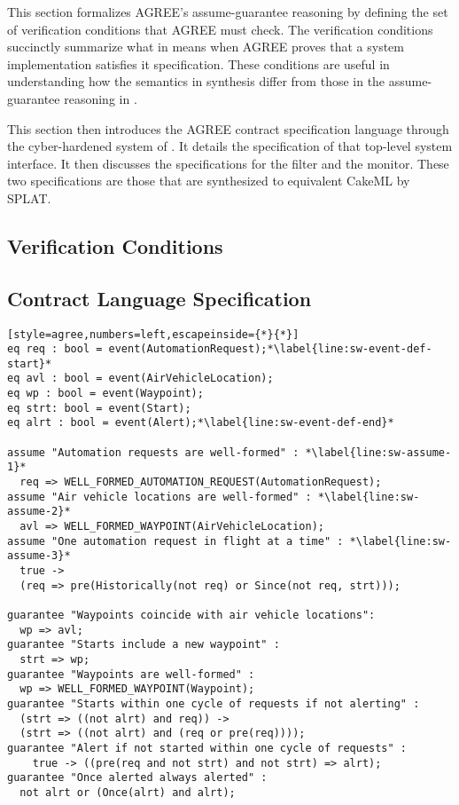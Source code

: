 This section formalizes AGREE's assume-guarantee reasoning by defining the set of verification conditions that AGREE must check.
The verification conditions succinctly summarize what in means when AGREE proves that a system implementation satisfies it specification.
These conditions are useful in understanding how the semantics in synthesis differ from those in the assume-guarantee reasoning in .

This section then introduces the AGREE contract specification language through the cyber-hardened system of .
It details the specification of that top-level system interface.
It then discusses the specifications for the filter and the monitor.
These two specifications are those that are synthesized to equivalent CakeML by SPLAT.

\subsection{Verification Conditions}


\subsection{Contract Language Specification}
\newsavebox{\sw}
\begin{lrbox}{\sw}
\begin{lstlisting}[style=agree,numbers=left,escapeinside={*}{*}]
eq req : bool = event(AutomationRequest);*\label{line:sw-event-def-start}*
eq avl : bool = event(AirVehicleLocation);
eq wp : bool = event(Waypoint);
eq strt: bool = event(Start);
eq alrt : bool = event(Alert);*\label{line:sw-event-def-end}*

assume "Automation requests are well-formed" : *\label{line:sw-assume-1}*
  req => WELL_FORMED_AUTOMATION_REQUEST(AutomationRequest);
assume "Air vehicle locations are well-formed" : *\label{line:sw-assume-2}*
  avl => WELL_FORMED_WAYPOINT(AirVehicleLocation);    
assume "One automation request in flight at a time" : *\label{line:sw-assume-3}*
  true -> 
  (req => pre(Historically(not req) or Since(not req, strt)));
      
guarantee "Waypoints coincide with air vehicle locations":
  wp => avl;
guarantee "Starts include a new waypoint" :
  strt => wp;
guarantee "Waypoints are well-formed" : 
  wp => WELL_FORMED_WAYPOINT(Waypoint);
guarantee "Starts within one cycle of requests if not alerting" :
  (strt => ((not alrt) and req)) -> 
  (strt => ((not alrt) and (req or pre(req))));
guarantee "Alert if not started within one cycle of requests" :
    true -> ((pre(req and not strt) and not strt) => alrt);
guarantee "Once alerted always alerted" :
  not alrt or (Once(alrt) and alrt);
\end{lstlisting}
\end{lrbox}

